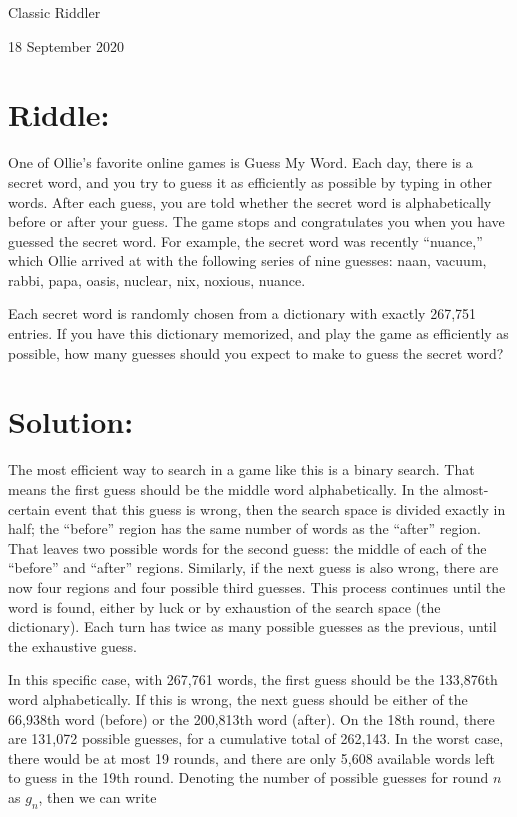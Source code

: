 \documentclass{article}
\begin{document}
\pagestyle{empty} %

\begin{center}
{\LARGE Classic Riddler}

\vspace{0.15in}

{\Large 18 September 2020}
\end{center}


\section*{Riddle:}

One of Ollie's favorite online games is Guess My Word.
Each day, there is a secret word, and you try to guess it as efficiently as possible by typing in other words.
After each guess, you are told whether the secret word is alphabetically before or after your guess.
The game stops and congratulates you when you have guessed the secret word.
For example, the secret word was recently ``nuance,'' which Ollie arrived at with the following series of nine guesses: naan, vacuum, rabbi, papa, oasis, nuclear, nix, noxious, nuance.

Each secret word is randomly chosen from a dictionary with exactly 267,751 entries.
If you have this dictionary memorized, and play the game as efficiently as possible, how many guesses should you expect to make to guess the secret word?

\section*{Solution:}

The most efficient way to search in a game like this is a binary search.
That means the first guess should be the middle word alphabetically.
In the almost-certain event that this guess is wrong, then the search space is divided exactly in half; the ``before'' region has the same number of words as the ``after'' region.
That leaves two possible words for the second guess: the middle of each of the ``before'' and ``after'' regions.
Similarly, if the next guess is also wrong, there are now four regions and four possible third guesses.
This process continues until the word is found, either by luck or by exhaustion of the search space (the dictionary).
Each turn has twice as many possible guesses as the previous, until the exhaustive guess.

In this specific case, with 267,761 words, the first guess should be the 133,876th word alphabetically.
If this is wrong, the next guess should be either of the 66,938th word (before) or the 200,813th word (after).
On the 18th round, there are 131,072 possible guesses, for a cumulative total of 262,143.
In the worst case, there would be at most 19 rounds, and there are only 5,608 available words left to guess in the 19th round.
Denoting the number of possible guesses for round $n$ as $g_{n}$, then we can write
\end{document}
